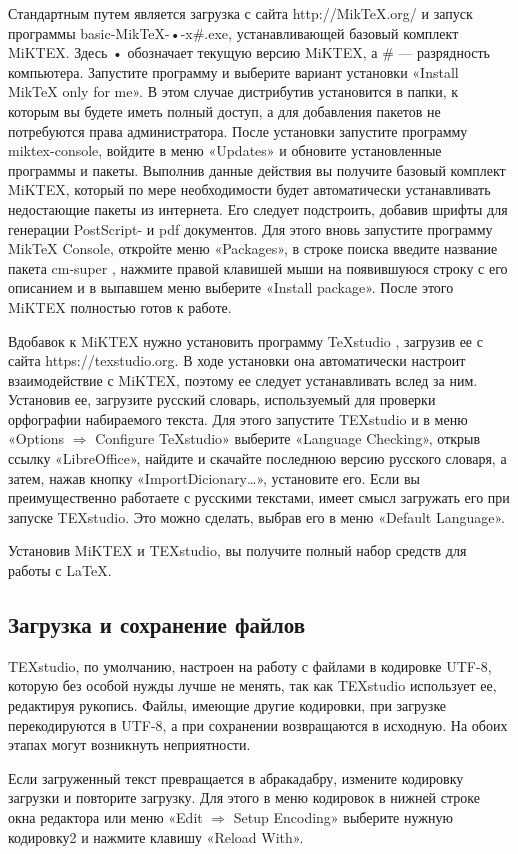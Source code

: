 \documentclass[a4paper, 14pt]{extarticle}
\newcommand{\n}{\par}
\begin{document}
	Стандартным путем является загрузка с сайта http://MikTeX.org/ и запуск программы basic-MikTeX-•-x\#.exe, устанавливающей базовый комплект MiKTEX. Здесь • обозначает текущую версию MiKTEX, а \# — разрядность компьютера. Запустите программу и выберите вариант установки «Install MikTeX only for me». В этом случае дистрибутив установится в папки, к которым вы будете иметь полный доступ, а для добавления пакетов не потребуются права администратора. После установки запустите программу miktex-console, войдите в меню «Updates» и обновите установленные программы и пакеты. Выполнив данные действия вы получите базовый комплект MiKTEX, который по мере необходимости будет автоматически устанавливать недостающие пакеты из интернета. Его следует подстроить, добавив шрифты для генерации PostScript- и pdf документов. Для этого вновь запустите программу MikTeX Console, откройте меню «Packages», в строке поиска введите название пакета cm-super , нажмите правой клавишей мыши на появившуюся строку с его описанием и в выпавшем меню выберите «Install package». После этого MiKTEX полностью готов к работе.\n
	Вдобавок к MiKTEX нужно установить программу TeXstudio , загрузив ее с сайта https://texstudio.org. В ходе установки она автоматически настроит взаимодействие с MiKTEX, поэтому ее следует устанавливать вслед за ним. Установив ее, загрузите русский словарь, используемый для проверки орфографии набираемого текста. Для этого запустите TEXstudio и в меню «Options $\Longrightarrow$ Configure TeXstudio» выберите «Language Checking», открыв ссылку «LibreOffice», найдите и скачайте последнюю версию русского словаря, а затем, нажав кнопку «ImportDicionary…», установите его. Если вы преимущественно работаете с русскими текстами, имеет смысл загружать его при запуске TEXstudio. Это можно сделать, выбрав его в меню «Default Language».\n
	
	Установив MiKTEX и TEXstudio, вы получите полный набор средств для работы с \LaTeX.
	
	\subsection*{Загрузка и сохранение файлов}
	TEXstudio, по умолчанию, настроен на работу с файлами в кодировке UTF-8, которую без особой нужды лучше не менять, так как TEXstudio использует ее, редактируя рукопись. Файлы, имеющие другие кодировки, при загрузке перекодируются в UTF-8, а при сохранении возвращаются в исходную. На обоих этапах могут возникнуть неприятности.\n
	
	Если загруженный текст превращается в абракадабру, измените кодировку загрузки и повторите загрузку. Для этого в меню кодировок в нижней строке окна редактора или меню «Edit $\Longrightarrow$ Setup Encoding» выберите нужную кодировку2 и нажмите клавишу «Reload With».\n
	
\end{document}
